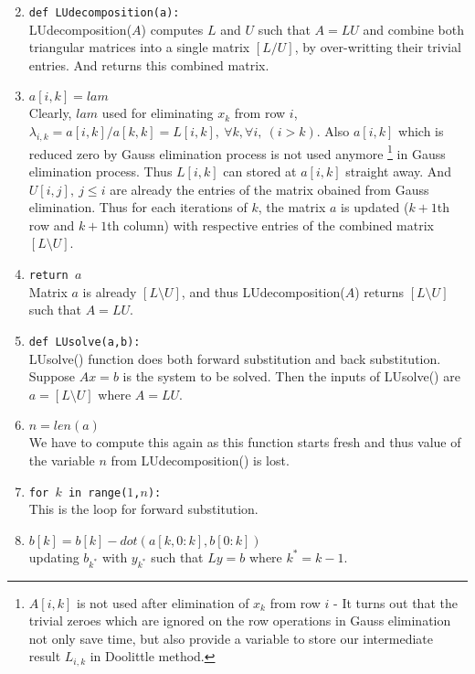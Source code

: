 \begin{commentary}
\begin{enumerate}[label=Line \arabic*]
	\setcounter{enumi}{1}
	\item \texttt{def LUdecomposition(a):} \\ LUdecomposition($A$) computes $L$ and $U$ such that $A = LU$ and combine both triangular matrices into a single matrix $[L/U]$, by over-writting their trivial entries.
		And returns this combined matrix.
	\setcounter{enumi}{8}
	\item \texttt{$a[i,k]=lam$} \\ Clearly, $lam$ used for eliminating $x_k$ from row $i$, $\lambda_{i,k} = a[i,k]/a[k,k] = L[i,k],\ \forall k, \forall i,\ (i>k)$.
		Also $a[i,k]$ which is reduced zero by Gauss elimination process is not used anymore
		\footnote{
			$A[i,k]$ is not used after elimination of $x_k$ from row $i$ - It turns out that the trivial zeroes which are ignored on the row operations in Gauss elimination not only save time, but also provide a variable to store our intermediate result $L_{i,k}$ in Doolittle method.}
		in Gauss elimination process.
		Thus $L[i,k]$ can stored at $a[i,k]$ straight away.
		And $U[i,j],\ j\le i$ are already the entries of the matrix obained from Gauss elimination.
		Thus for each iterations of $k$, the matrix $a$ is updated ($k+1$th row and $k+1$th column) with respective entries of the combined matrix $[L\text{\textbackslash{}}U]$.
	\item \texttt{return $a$} \\ Matrix $a$ is already $[L\text{\textbackslash{}}U]$, and thus LUdecomposition($A$) returns $[L\text{\textbackslash{}}U]$ such that $A = LU$.
	\item \texttt{def LUsolve(a,b):} \\ LUsolve() function does both forward substitution and back substitution.
		Suppose $Ax = b$ is the system to be solved.
		Then the inputs of LUsolve() are $ a = [L\text{\textbackslash{}}U]$ where $A = LU$. 
	\item \texttt{$n = len(a)$} \\ We have to compute this again as this function starts fresh and thus value of the variable $n$ from LUdecomposition() is lost.
	\item \texttt{for $k$ in range($1$,$n$):} \\ This is the loop for forward substitution.
	\item \texttt{$b[k] = b[k]-dot(a[k,0:k],b[0:k])$} \\ updating $b_{k^*}$ with $y_{k^*}$ such that $Ly = b$ where $k^* = k-1$.

\end{enumerate}
\end{commentary}
